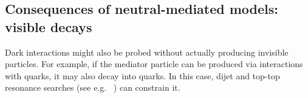 \subsection{Consequences of neutral-mediated models: visible decays}
\label{sec:MediatorSearches}
\label{sub:twoBody}





Dark interactions might also be probed without actually producing invisible particles.
For example, if the mediator particle can be produced via interactions with quarks, it may also decay into quarks. 
In this case, dijet and top-top resonance searches (see e.g. ~\cite{Liew:2016oon,Fairbairn:2016iuf,Chala:2015ama}) can constrain it.

